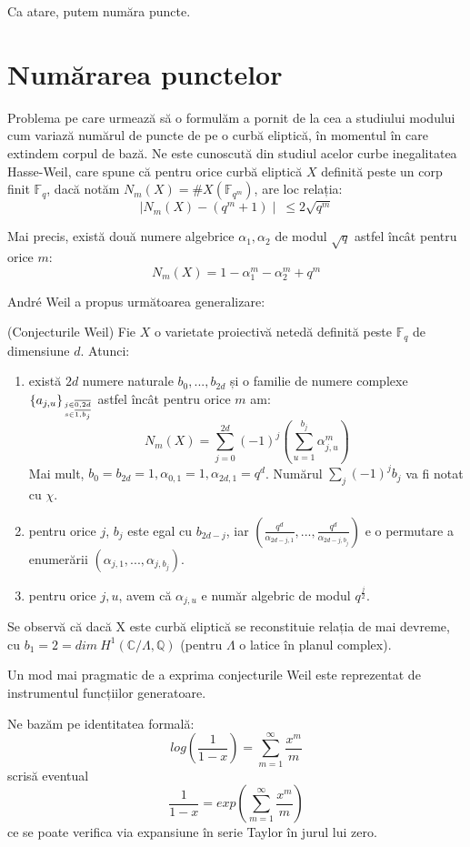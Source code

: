 \documentclass[13pt,openany]{book}
\begin{document}
Ca atare, putem număra puncte.

\chapter{Numărarea punctelor}

Problema pe care urmează să o formulăm a pornit de la cea a studiului modului cum variază numărul de puncte de pe o curbă eliptică, în momentul în care extindem corpul de bază. Ne este cunoscută din studiul acelor curbe inegalitatea Hasse-Weil, care spune că pentru orice curbă eliptică $X$ definită peste un corp finit $\mathbb{F}_q$, dacă notăm $N_m(X)=\#X(\mathbb{F}_{q^m})$, are loc relația:
$$\mid N_m(X) - (q^m+1)\mid\  \leq 2\sqrt{q^m}$$

Mai precis, există două numere algebrice $\alpha_1,\alpha_2$ de modul $\sqrt{q}$ astfel încât pentru orice $m$:
$$N_m(X) = 1 - \alpha_1^m - \alpha_2^m + q^m$$

André Weil a propus următoarea generalizare:
\begin{teo}
(Conjecturile Weil) Fie $X$ o varietate proiectivă netedă definită peste $\mathbb{F}_q$ de dimensiune $d$. Atunci:
\begin{enumerate}
\item există $2d$ numere naturale $b_0,...,b_{2d}$ și o familie de numere complexe $\{a_{j,u}\}_{j\in\overline{0,2d}\atop s\in\overline{1,b_j}}$ astfel încât pentru orice $m$ am:
$$N_m(X)=\sum\limits_{j=0}^{2d} (-1)^j (\sum\limits_{u=1}^{b_j} \alpha_{j,u}^m)$$
Mai mult, $b_0=b_{2d}=1, \alpha_{0,1}=1, \alpha_{2d,1}=q^d$. Numărul $\sum\limits_j (-1)^j b_j$ va fi notat cu $\chi$.
\item pentru orice $j$, $b_j$ este egal cu $b_{2d-j}$, iar $(\frac{q^d}{\alpha_{2d-j,1}},...,\frac{q^d}{\alpha_{2d-j,b_j}})$ e o permutare a enumerării $(\alpha_{j,1},...,\alpha_{j,b_j})$.
\item pentru orice $j,u$, avem că $\alpha_{j,u}$ e număr algebric de modul $q^{\frac{j}{2}}$.
\end{enumerate}
\end{teo}

Se observă că dacă X este curbă eliptică se reconstituie relația de mai devreme, cu $b_1=2=dim\ H^1(\mathbb{C}/\Lambda, \mathbb{Q})$ (pentru $\Lambda$ o latice în planul complex).

Un mod mai pragmatic de a exprima conjecturile Weil este reprezentat de instrumentul funcțiilor generatoare.

Ne bazăm pe identitatea formală:
$$log(\frac{1}{1-x})=\sum\limits_{m=1}^{\infty} \frac{x^m}{m}$$
scrisă eventual
$$\frac{1}{1-x}=exp(\sum\limits_{m=1}^{\infty} \frac{x^m}{m})$$
ce se poate verifica via expansiune în serie Taylor în jurul lui zero.
\end{document}

